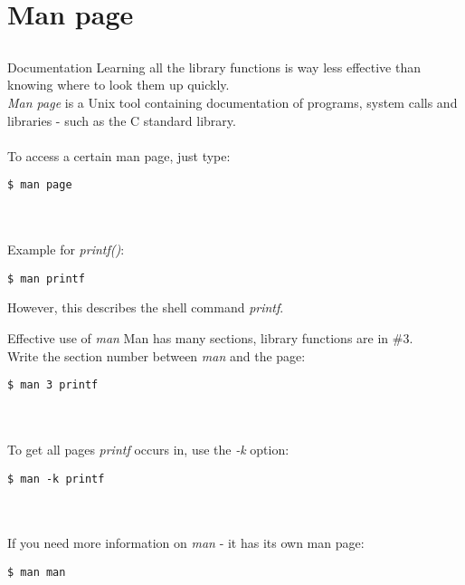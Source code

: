 \section{Man page}
\subsection{}
\begin{frame}[fragile]{Documentation}
	Learning all the library functions is way less effective than knowing where to look them up quickly. \\
	\textit{Man page} is a Unix tool containing documentation of programs, system calls and libraries - such as the C standard library. \\ \ \\
	To access a certain man page, just type:
	\begin{lstlisting}[numbers=none, basicstyle=\itshape\small]
$ man page
\end{lstlisting} \ \\ \ \\
Example for \textit{printf()}:
	\begin{lstlisting}[numbers=none]
$ man printf
\end{lstlisting}
However, this describes the shell command \textit{printf}.
\end{frame}
\begin{frame}[fragile]{Effective use of \textit{man}}
	Man has many sections, library functions are in \#3. \\
	Write the section number between \textit{man} and the page:
	\begin{lstlisting}[numbers=none]
$ man 3 printf
\end{lstlisting} \ \\ \ \\
	To get all pages \textit{printf} occurs in, use the \textit{-k} option:
	\begin{lstlisting}[numbers=none]
$ man -k printf
\end{lstlisting} \ \\ \ \\
	If you need more information on \textit{man} - it has its own man page:
	\begin{lstlisting}[numbers=none]
$ man man
\end{lstlisting}
\end{frame}


